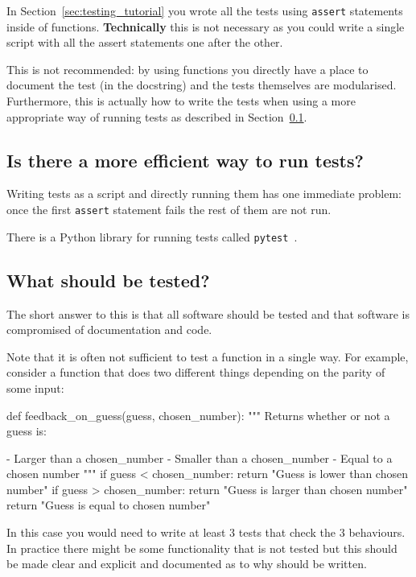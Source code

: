 In Section~\ref{sec:testing_tutorial} you wrote all the tests using
\texttt{assert} statements inside of functions. \textbf{Technically} this is not
necessary as you could write a single script with all the assert statements one
after the other.

This is not recommended: by using functions you directly have a place to document
the test (in the docstring) and the tests themselves are modularised.
Furthermore, this is actually how to write the tests when using a more
appropriate way of running tests as described in
Section~\ref{sec:is_there_a_more_efficient_way_to_run_tests}.


\subsection{Is there a more efficient way to run tests?}
\label{sec:is_there_a_more_efficient_way_to_run_tests}

Writing tests as a script and directly running them has one immediate problem:
once the first \texttt{assert} statement fails the rest of them are not run.


There is a Python library for running tests called
\texttt{pytest}~\cite{oliveira2018pytest}.

\subsection{What should be tested?}

The short answer to this is that all software should be tested and that software
is compromised of documentation and code.


Note that it is often not sufficient to test a function in a single way. For
example, consider a function that does two different things depending on the
parity of some input:

\begin{python}
def feedback_on_guess(guess, chosen_number):
    """
    Returns whether or not a guess is:

    - Larger than  a chosen_number
    - Smaller than a chosen_number
    - Equal to a chosen number
    """
    if guess < chosen_number:
        return "Guess is lower than chosen number"
    if guess > chosen_number:
        return "Guess is larger than chosen number"
    return "Guess is equal to chosen number"
\end{python}

In this case you would need to write at least 3 tests that check the 3
behaviours.
In practice there might be some functionality that is not tested but this should
be made clear and explicit and documented as to why should be written.


